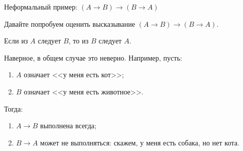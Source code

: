 \documentclass[handout]{beamer}
\begin{document}
\begin{frame}{Неформальный пример: $(A \rightarrow B) \rightarrow (B \rightarrow A)$}

Давайте попробуем оценить высказывание $(A \rightarrow B) \rightarrow (B \rightarrow A)$.\pause

\vspace{0.5cm}

Если из $A$ следует $B$, то из $B$ следует $A$.\pause

\vspace{0.5cm}

Наверное, в общем случае это неверно. Например, пусть:

\begin{enumerate}
\item $A$ означает <<у меня есть кот>>;\pause
\item $B$ означает <<у меня есть животное>>.
\end{enumerate}\pause

\vspace{0.5cm}
Тогда:
\begin{enumerate}
\item $A \rightarrow B$ выполнена всегда;\pause
\item $B \rightarrow A$ может не выполняться: скажем, у меня есть собака, но нет кота.
\end{enumerate}

\end{frame}
\end{document}

